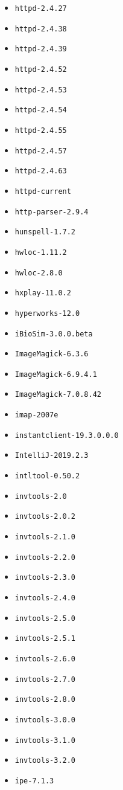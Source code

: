 \begin{multicols}{3}
\begin{itemize}
\item \verb|httpd-2.4.27|
\item \verb|httpd-2.4.38|
\item \verb|httpd-2.4.39|
\item \verb|httpd-2.4.52|
\item \verb|httpd-2.4.53|
\item \verb|httpd-2.4.54|
\item \verb|httpd-2.4.55|
\item \verb|httpd-2.4.57|
\item \verb|httpd-2.4.63|
\item \verb|httpd-current|
\item \verb|http-parser-2.9.4|
\item \verb|hunspell-1.7.2|
\item \verb|hwloc-1.11.2|
\item \verb|hwloc-2.8.0|
\item \verb|hxplay-11.0.2|
\item \verb|hyperworks-12.0|
\item \verb|iBioSim-3.0.0.beta|
\item \verb|ImageMagick-6.3.6|
\item \verb|ImageMagick-6.9.4.1|
\item \verb|ImageMagick-7.0.8.42|
\item \verb|imap-2007e|
\item \verb|instantclient-19.3.0.0.0|
\item \verb|IntelliJ-2019.2.3|
\item \verb|intltool-0.50.2|
\item \verb|invtools-2.0|
\item \verb|invtools-2.0.2|
\item \verb|invtools-2.1.0|
\item \verb|invtools-2.2.0|
\item \verb|invtools-2.3.0|
\item \verb|invtools-2.4.0|
\item \verb|invtools-2.5.0|
\item \verb|invtools-2.5.1|
\item \verb|invtools-2.6.0|
\item \verb|invtools-2.7.0|
\item \verb|invtools-2.8.0|
\item \verb|invtools-3.0.0|
\item \verb|invtools-3.1.0|
\item \verb|invtools-3.2.0|
\item \verb|ipe-7.1.3|

\end{itemize}
\end{multicols}
